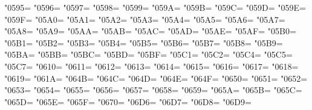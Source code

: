 \XeTeXcharclass"0595=\KclassCM
\XeTeXcharclass"0596=\KclassCM
\XeTeXcharclass"0597=\KclassCM
\XeTeXcharclass"0598=\KclassCM
\XeTeXcharclass"0599=\KclassCM
\XeTeXcharclass"059A=\KclassCM
\XeTeXcharclass"059B=\KclassCM
\XeTeXcharclass"059C=\KclassCM
\XeTeXcharclass"059D=\KclassCM
\XeTeXcharclass"059E=\KclassCM
\XeTeXcharclass"059F=\KclassCM
\XeTeXcharclass"05A0=\KclassCM
\XeTeXcharclass"05A1=\KclassCM
\XeTeXcharclass"05A2=\KclassCM
\XeTeXcharclass"05A3=\KclassCM
\XeTeXcharclass"05A4=\KclassCM
\XeTeXcharclass"05A5=\KclassCM
\XeTeXcharclass"05A6=\KclassCM
\XeTeXcharclass"05A7=\KclassCM
\XeTeXcharclass"05A8=\KclassCM
\XeTeXcharclass"05A9=\KclassCM
\XeTeXcharclass"05AA=\KclassCM
\XeTeXcharclass"05AB=\KclassCM
\XeTeXcharclass"05AC=\KclassCM
\XeTeXcharclass"05AD=\KclassCM
\XeTeXcharclass"05AE=\KclassCM
\XeTeXcharclass"05AF=\KclassCM
\XeTeXcharclass"05B0=\KclassCM
\XeTeXcharclass"05B1=\KclassCM
\XeTeXcharclass"05B2=\KclassCM
\XeTeXcharclass"05B3=\KclassCM
\XeTeXcharclass"05B4=\KclassCM
\XeTeXcharclass"05B5=\KclassCM
\XeTeXcharclass"05B6=\KclassCM
\XeTeXcharclass"05B7=\KclassCM
\XeTeXcharclass"05B8=\KclassCM
\XeTeXcharclass"05B9=\KclassCM
\XeTeXcharclass"05BA=\KclassCM
\XeTeXcharclass"05BB=\KclassCM
\XeTeXcharclass"05BC=\KclassCM
\XeTeXcharclass"05BD=\KclassCM
\XeTeXcharclass"05BF=\KclassCM
\XeTeXcharclass"05C1=\KclassCM
\XeTeXcharclass"05C2=\KclassCM
\XeTeXcharclass"05C4=\KclassCM
\XeTeXcharclass"05C5=\KclassCM
\XeTeXcharclass"05C7=\KclassCM
\XeTeXcharclass"0610=\KclassCM
\XeTeXcharclass"0611=\KclassCM
\XeTeXcharclass"0612=\KclassCM
\XeTeXcharclass"0613=\KclassCM
\XeTeXcharclass"0614=\KclassCM
\XeTeXcharclass"0615=\KclassCM
\XeTeXcharclass"0616=\KclassCM
\XeTeXcharclass"0617=\KclassCM
\XeTeXcharclass"0618=\KclassCM
\XeTeXcharclass"0619=\KclassCM
\XeTeXcharclass"061A=\KclassCM
\XeTeXcharclass"064B=\KclassCM
\XeTeXcharclass"064C=\KclassCM
\XeTeXcharclass"064D=\KclassCM
\XeTeXcharclass"064E=\KclassCM
\XeTeXcharclass"064F=\KclassCM
\XeTeXcharclass"0650=\KclassCM
\XeTeXcharclass"0651=\KclassCM
\XeTeXcharclass"0652=\KclassCM
\XeTeXcharclass"0653=\KclassCM
\XeTeXcharclass"0654=\KclassCM
\XeTeXcharclass"0655=\KclassCM
\XeTeXcharclass"0656=\KclassCM
\XeTeXcharclass"0657=\KclassCM
\XeTeXcharclass"0658=\KclassCM
\XeTeXcharclass"0659=\KclassCM
\XeTeXcharclass"065A=\KclassCM
\XeTeXcharclass"065B=\KclassCM
\XeTeXcharclass"065C=\KclassCM
\XeTeXcharclass"065D=\KclassCM
\XeTeXcharclass"065E=\KclassCM
\XeTeXcharclass"065F=\KclassCM
\XeTeXcharclass"0670=\KclassCM
\XeTeXcharclass"06D6=\KclassCM
\XeTeXcharclass"06D7=\KclassCM
\XeTeXcharclass"06D8=\KclassCM
\XeTeXcharclass"06D9=\KclassCM
